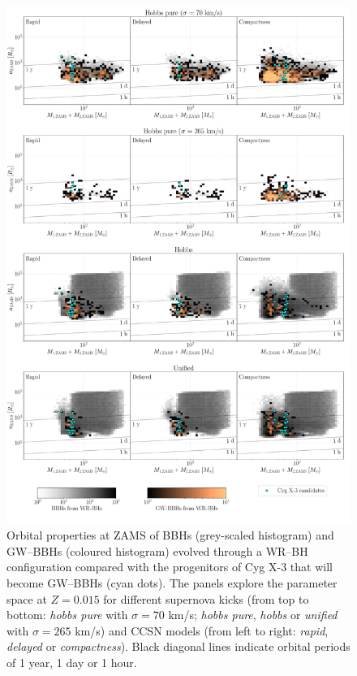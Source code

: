 \documentclass[a4paper,titlepage]{book}     	%
\begin{document}
\begin{figure}[h!]
	\centering
	\includegraphics[width=\textwidth]{./images/kickcompare_prog_015.pdf}	
	\caption{Orbital properties at ZAMS of BBHs (grey-scaled histogram) and GW--BBHs (coloured histogram) evolved through a WR--BH configuration compared with the progenitors of Cyg X-3 that will become GW--BBHs (cyan dots). The panels explore the parameter space at $Z=0.015$ for different supernova kicks (from top to bottom: \emph{hobbs pure} with $\sigma = 70$ km/s; \emph{hobbs pure}, \emph{hobbs} or \emph{unified} with $\sigma = 265$ km/s) and CCSN models (from left to right: \emph{rapid}, \emph{delayed} or \emph{compactness}). Black diagonal lines indicate orbital periods of 1 year, 1 day or 1 hour.}\label{fig:resultsCygX3progbinaries}
\end{figure}
\end{document}
